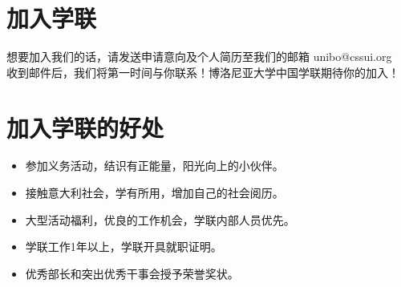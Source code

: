 
\section{加入学联}
想要加入我们的话，请发送申请意向及个人简历至我们的邮箱 unibo@cssui.org\\
收到邮件后，我们将第一时间与你联系！博洛尼亚大学中国学联期待你的加入！


\section{加入学联的好处}
\begin{itemize}
\item 参加义务活动，结识有正能量，阳光向上的小伙伴。
\item 接触意大利社会，学有所用，增加自己的社会阅历。
\item 大型活动福利，优良的工作机会，学联内部人员优先。
\item 学联工作1年以上，学联开具就职证明。
\item 优秀部长和突出优秀干事会授予荣誉奖状。
\end{itemize}
